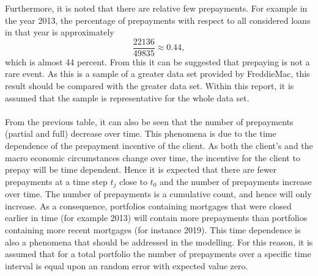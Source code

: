         Furthermore, it is noted that there are relative few 
        prepayments. For example in the year 2013, the percentage 
        of prepayments with respect to all considered loans in that year
        is approximately
        \begin{equation}
            \dfrac{
                22136  
            }{
                49835
            } \approx 0.44,
        \end{equation}
        which is almost 44 percent. From this it can be suggested that 
        prepaying is not a rare event. As this is a sample of a greater 
        data set provided by FreddieMac, this result should be compared 
        with the greater data set. Within this report, it is assumed that
        the sample is representative for the whole data set.  
        \\\\ 
        From the previous table, it can also be seen that the number of 
        prepayments (partial and full) decrease over time. This 
        phenomena is due to the time dependence of the prepayment 
        incentive of the client. As both the client's and the macro 
        economic circumstances change over time, the incentive for 
        the client to prepay will  be time dependent. Hence it is 
        expected that there are fewer prepayments at a time step $t_j$ 
        close to $t_0$ and the number of prepayments increase over 
        time. The number of prepayments is a cumulative count, and hence 
        will only increase. As a consequence, portfolios containing 
        mortgages that were closed earlier in time (for example 2013)
        will contain more prepayments than portfolios containing more 
        recent mortgages (for instance 2019). This time dependence is 
        also a phenomena that should be addressed in the modelling.
        For this reason, it is assumed that for a total portfolio 
        the number of prepayments over a specific time interval is 
        equal upon an random error with expected value zero.
        

